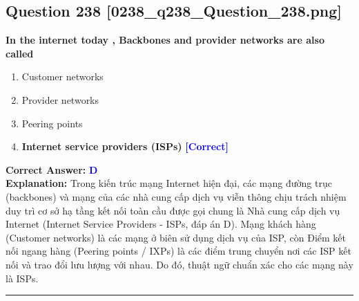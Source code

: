 \documentclass[11pt,a4paper]{article}
\begin{document}
\begin{minipage}{\textwidth}
\subsection*{Question 238 \quad \footnotesize{[0238\_q238\_Question\_238.png]}}
\noindent \textbf{In the internet today , Backbones and provider networks are also called}

\begin{enumerate}[label=\Alph*.]
    \item Customer networks
    \item Provider networks
    \item Peering points
    \item \textbf{Internet service providers (ISPs)} \hfill \textcolor{blue}{\textbf{[Correct]}}
\end{enumerate}

\noindent \textbf{Correct Answer:} \textcolor{blue}{\textbf{D}} \\[2pt]
\noindent \textbf{Explanation:} Trong kiến trúc mạng Internet hiện đại, các mạng đường trục (backbones) và mạng của các nhà cung cấp dịch vụ viễn thông chịu trách nhiệm duy trì cơ sở hạ tầng kết nối toàn cầu được gọi chung là Nhà cung cấp dịch vụ Internet (Internet Service Providers - ISPs, đáp án D). Mạng khách hàng (Customer networks) là các mạng ở biên sử dụng dịch vụ của ISP, còn Điểm kết nối ngang hàng (Peering points / IXPs) là các điểm trung chuyển nơi các ISP kết nối và trao đổi lưu lượng với nhau. Do đó, thuật ngữ chuẩn xác cho các mạng này là ISPs.

\par\vspace{0.3cm}
\hrule
\vspace{0.3cm}
\end{minipage}
\end{document}
